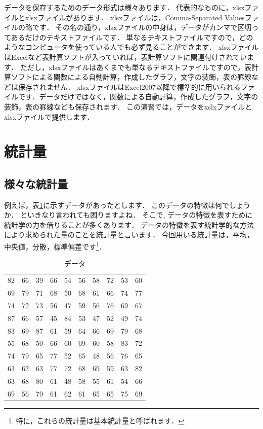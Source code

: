 データを保存するためのデータ形式は様々あります．
代表的なものに，xlsxファイルとxlsxファイルがあります．
xlsxファイルは，Comma-Separated Valuesファイルの略です．
その名の通り，xlsxファイルの中身は，データがカンマで区切ってあるだけのテキストファイルです．
単なるテキストファイルですので，どのようなコンピュータを使っている人でも必ず見ることができます．
xlsxファイルはExcelなど表計算ソフトが入っていれば，表計算ソフトに関連付けされています．
ただし，xlsxファイルはあくまでも単なるテキストファイルですので，表計算ソフトによる関数による自動計算，作成したグラフ，文字の装飾，表の罫線などは保存されません．
xlsxファイルはExcel2007以降で標準的に用いられるファイルです．データだけではなく，関数による自動計算，作成したグラフ，文字の装飾，表の罫線なども保存されます．
この演習では，データをxslxファイルとxlsxファイルで提供します．

\section{統計量}

\subsection{様々な統計量}

例えば，表\ref{tab:sample}に示すデータがあったとします．
このデータの特徴は何でしょうか．
といきなり言われても困りますよね．
そこで, データの特徴を表すために統計学の力を借りることが多くあります．
データの特徴を表す統計学的な方法により求められた量のことを統計量と言います．
今回用いる統計量は，平均，中央値，分散，標準偏差です\footnote{特に，これらの統計量は基本統計量と呼ばれます．}．

\begin{table}[tb]
    \caption{データ}
    \centering
    \begin{tabular}{cccccccccc}
       82 & 66 & 39 & 66 & 54 & 56 & 58 & 72 & 53 & 60 \\
       69 & 79 & 71 & 68 & 50 & 68 & 61 & 66 & 74 & 77 \\
       74 & 72 & 73 & 56 & 47 & 59 & 56 & 76 & 69 & 67 \\
       87 & 66 & 57 & 45 & 84 & 53 & 47 & 52 & 49 & 74 \\
       83 & 69 & 87 & 61 & 59 & 64 & 66 & 69 & 79 & 68 \\
       55 & 68 & 50 & 66 & 60 & 69 & 60 & 58 & 83 & 72 \\
       74 & 79 & 65 & 77 & 52 & 65 & 48 & 56 & 76 & 65 \\
       63 & 62 & 63 & 77 & 72 & 68 & 69 & 59 & 63 & 82 \\
       63 & 68 & 80 & 61 & 48 & 58 & 55 & 61 & 54 & 66 \\
       69 & 56 & 79 & 61 & 62 & 61 & 65 & 65 & 75 & 69 \\
    \end{tabular}
    \label{tab:sample}
\end{table}

